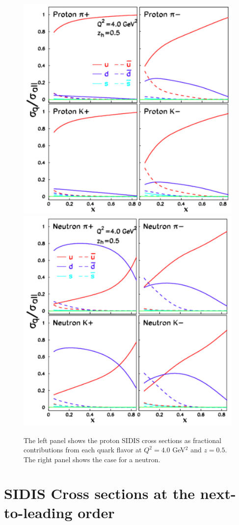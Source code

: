 \begin{figure}[tbhp]
   \includegraphics[width=0.51\linewidth]{figs_xj/crossq_ratio_proton_052014.pdf}
    \includegraphics[width=0.51\linewidth]{figs_xj/crossq_ratio_neutron_052014.pdf} \\
\caption{\label{fig:crossq} The left panel shows the  
proton SIDIS cross sections as fractional contributions from 
each quark flavor at $Q^2=4.0$ GeV$^2$ and $z=0.5$.
The right panel shows the case for a neutron. 
}
\end{figure}

\section{SIDIS Cross sections at the next-to-leading order}


